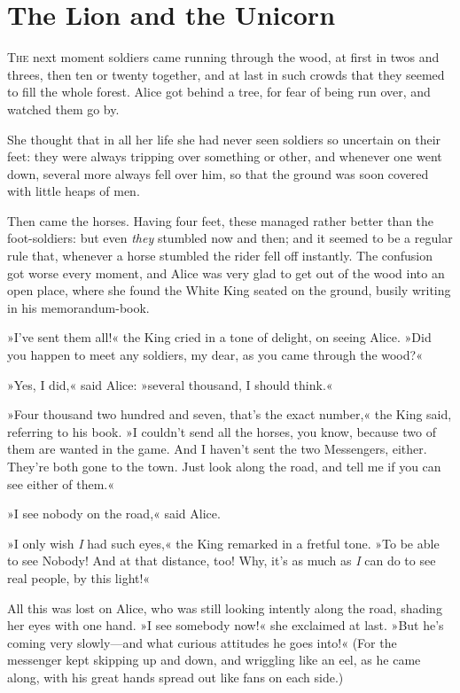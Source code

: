 \chapter{The Lion and the Unicorn}

\label{white6}

\lettrine[lines=4]{T}{he} next moment soldiers came running through the wood, at first in twos and threes, then ten or twenty together, and at last in such crowds that they seemed to fill the whole forest. Alice got behind a tree, for fear of being run over, and watched them go by.

She thought that in all her life she had never seen soldiers so uncertain on their feet: they were always tripping over something or other, and whenever one went down, several more always fell over him, so that the ground was soon covered with little heaps of men.

Then came the horses. Having four feet, these managed rather better than the foot-soldiers: but even \textit{they} stumbled now and then; and it seemed to be a regular rule that, whenever a horse stumbled the rider fell off instantly. The confusion got worse every moment, and Alice was very glad to get out of the wood into an open place, where she found the White King seated on the ground, busily writing in his memorandum-book.

»I've sent them all!« the King cried in a tone of delight, on seeing Alice. »Did you happen to meet any soldiers, my dear, as you came through the wood?«

»Yes, I did,« said Alice: »several thousand, I should think.«

»Four thousand two hundred and seven, that's the exact number,« the King said, referring to his book. »I couldn't send all the horses, you know, because two of them are wanted in the game. And I haven't sent the two Messengers, either. They're both gone to the town. Just look along the road, and tell me if you can see either of them.«

»I see nobody on the road,« said Alice.

»I only wish \textit{I} had such eyes,« the King remarked in a fretful tone. »To be able to see Nobody! And at that distance, too! Why, it's as much as \textit{I} can do to see real people, by this light!«

All this was lost on Alice, who was still looking intently along the road, shading her eyes with one hand. »I see somebody now!« she exclaimed at last. »But he's coming very slowly—and what curious attitudes he goes into!« (For the messenger kept skipping up and down, and wriggling like an eel, as he came along, with his great hands spread out like fans on each side.)

